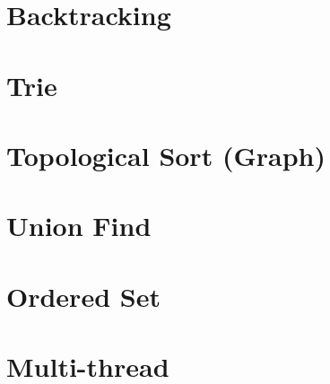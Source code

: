 \section{Backtracking}


\section{Trie}


\section{Topological Sort (Graph)}


\section{Union Find}


\section{Ordered Set}


\section{Multi-thread}


